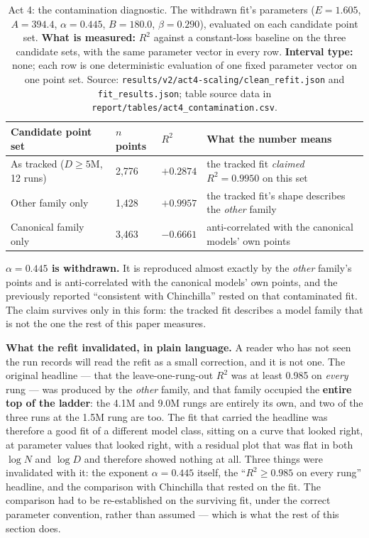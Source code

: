 \documentclass[11pt,a4paper]{article}
\begin{document}
\begin{table}[H]
\centering
\begin{tabular}{L{4.8cm}R{1.8cm}R{2.4cm}L{4.4cm}}
\toprule
Candidate point set & $n$ points & $R^2$ & What the number means \\
\midrule
As tracked ($D \geq 5$M, 12 runs) & 2,776 & $+0.2874$ & the tracked fit \emph{claimed} $R^2 = 0.9950$ on this set \\
Other family only & 1,428 & $+0.9957$ & the tracked fit's shape describes the \emph{other} family \\
Canonical family only & 3,463 & $-0.6661$ & anti-correlated with the canonical models' own points \\
\bottomrule
\end{tabular}
\caption{Act 4: the contamination diagnostic. The withdrawn fit's parameters
($E = 1.605$, $A = 394.4$, $\alpha = 0.445$, $B = 180.0$, $\beta = 0.290$),
evaluated on each candidate point set. \textbf{What is measured:} $R^2$ against
a constant-loss baseline on the three candidate sets, with the same parameter
vector in every row. \textbf{Interval type:} none; each row is one
deterministic evaluation of one fixed parameter vector on one point set.
Source: \texttt{results/v2/act4-scaling/clean\_refit.json} and
\texttt{fit\_results.json}; table source data in
\texttt{report/tables/act4\_contamination.csv}.}
\label{tab:act4-contam}
\end{table}

\textbf{$\alpha = 0.445$ is withdrawn.} It is reproduced almost exactly by the
\emph{other} family's points and is anti-correlated with the canonical models'
own points, and the previously reported ``consistent with Chinchilla'' rested
on that contaminated fit. The claim survives only in this form: the tracked
fit describes a model family that is not the one the rest of this paper
measures. %

\textbf{What the refit invalidated, in plain language.} A reader who has not
seen the run records will read the refit as a small correction, and it is not
one. The original headline --- that the leave-one-rung-out $R^2$ was at least
0.985 on \emph{every} rung --- was produced by the \emph{other} family, and
that family occupied the \textbf{entire top of the ladder}: the 4.1M and 9.0M
rungs are entirely its own, and two of the three runs at the 1.5M rung are too.
The fit that carried the headline was therefore a good fit of a different model
class, sitting on a curve that looked right, at parameter values that looked
right, with a residual plot that was flat in both $\log N$ and $\log D$ and
therefore showed nothing at all. Three things were invalidated with it: the
exponent $\alpha = 0.445$ itself, the ``$R^2 \geq 0.985$ on every rung''
headline, and the comparison with Chinchilla that rested on the fit. The
comparison had to be re-established on the surviving fit, under the correct
parameter convention, rather than assumed --- which is what the rest of this
section does. %
\end{document}
